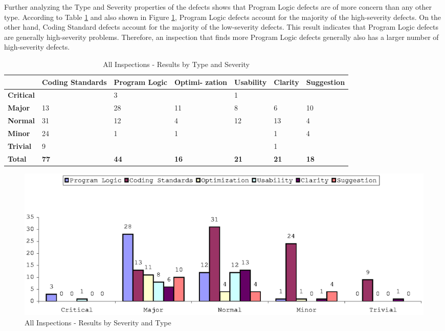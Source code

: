Further analyzing the Type and Severity properties of the defects shows
that Program Logic defects are of more concern than any other type.
According to Table \ref{tab:inspection-results-type-severity} and also
shown in Figure \ref{fig:inspection-results-7}, Program Logic defects
account for the majority of the high-severity defects. On the other hand,
Coding Standard defects account for the majority of the low-severity
defects. This result indicates that Program Logic defects are generally
high-severity problems. Therefore, an inspection that finds more Program
Logic defects generally also has a larger number of high-severity defects.

\begin{table}[!h]
  \begin{center}
    \caption{All Inspections - Results by Type and Severity}
    \label{tab:inspection-results-type-severity}
    \begin{tabular}{|p{2.0cm}|p{1.7cm}|p{1.5cm}|p{1.7cm}|p{1.4cm}|p{1.4cm}|p{1.5cm}|}  \hline   
\small{} & \small{}{\bf Coding Standards} & 
\small{}{\bf Program Logic} & \small{} {\bf Optimi- zation} & 
\small{}{\bf Usability} & \small{} {\bf Clarity} & 
\small{} {\bf Suggestion} \\ \hline

{\bf Critical} &   & 3 &   & 1 &   &      \\ \hline
{\bf Major}    & 13& 28& 11& 8 & 6 & 10    \\ \hline
{\bf Normal}   & 31& 12& 4 & 12& 13& 4    \\ \hline
{\bf Minor}    & 24& 1 & 1 &   & 1 & 4    \\ \hline
{\bf Trivial}  & 9 &   &   &   & 1 &      \\ \hline

{\bf Total} & {\bf 77} & {\bf 44} & {\bf 16} & {\bf 21} & {\bf 21} & {\bf
  18} \\ \hline
    \end{tabular}
  \end{center}
\end{table}

\begin{figure}[!h]
  \centering
  \includegraphics[width=1.0\textwidth]{figs/Results/inspection-results-7.eps}
  \caption{All Inspections - Results by Severity and Type}
  \label{fig:inspection-results-7}
\end{figure}

